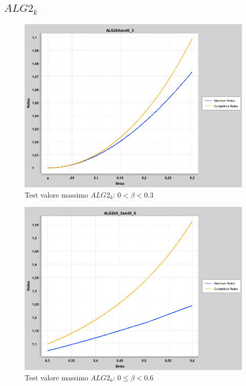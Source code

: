 \documentclass[12pt]{article}
\begin{document}
\subsection{$ALG2_{k}$}
\setcounter{figure}{0} 
\renewcommand{\thefigure}{\thesubsection.\arabic{figure}}
\begin{figure}[H]
\caption{Test valore massimo $ALG2_{k}$: $0 < \beta < 0.3$}
\centering
\includegraphics[scale=0.4]{max/ALG2k0and0_3.png}
\end{figure}
\begin{figure}[H]
\caption{Test valore massimo $ALG2_{k}$: $0 \leq \beta < 0.6$}
\centering
\includegraphics[scale=0.4]{max/ALG2k0_3and0_6.png}
\end{figure}
\end{document}
